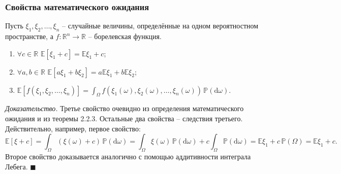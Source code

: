 \subsubsection{Свойства математического ожидания}
\begin{theorem}
Пусть $\xi_1, \xi_2, \ldots, \xi_n$ -- случайные величины, определённые на одном вероятностном пространстве, а $f: \mathbb{R}^n \to \mathbb{R}$ -- борелевская функция.
\begin{enumerate}
    \item $\forall c \in \mathbb{R}$ $\mathbb{E}[\xi_1 + c] = \mathbb{E}\xi_1 + c$;
    \item $\forall a, b \in \mathbb{R}$ $\mathbb{E}[a\xi_1 + b\xi_2] = a\mathbb{E}\xi_1 + b\mathbb{E}\xi_2$;
    \item $\mathbb{E}[f(\xi_1, \xi_2, \ldots, \xi_n)] = \displaystyle\int_{\Omega} f(\xi_1(\omega), \xi_2(\omega), \ldots, \xi_n(\omega)) \, \mathbb{P}(\mathrm{d}\omega)$.
\end{enumerate}
\end{theorem}

\textit{Доказательство.} Третье свойство очевидно из определения математического ожидания и из теоремы 2.2.3. Остальные два свойства -- следствия третьего. Действительно, например, первое свойство:
\[
\mathbb{E}[\xi + c] = \int_{\Omega} (\xi(\omega) + c) \, \mathbb{P}(\mathrm{d}\omega) = \int_{\Omega} \xi(\omega) \, \mathbb{P}(\mathrm{d}\omega) + c \int_{\Omega} \mathbb{P}(\mathrm{d}\omega) = \mathbb{E}\xi_1 + c\,\mathbb{P}(\Omega) = \mathbb{E}\xi_1 + c.
\]
Второе свойство доказывается аналогично с помощью аддитивности интеграла Лебега. $\blacksquare$


